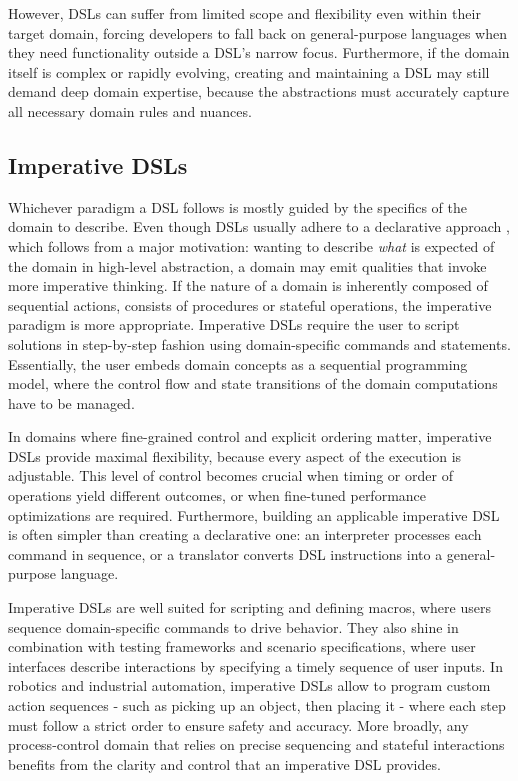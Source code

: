 However, DSLs can suffer from limited scope and flexibility even within their target domain, forcing developers to fall back on general-purpose languages when they need functionality outside a
DSL's narrow focus. Furthermore, if the domain itself is complex or rapidly evolving, creating and maintaining a DSL may still demand deep domain expertise, because the abstractions must
accurately capture all necessary domain rules and nuances.

\subsection{Imperative DSLs}

Whichever paradigm a DSL follows is mostly guided by the specifics of the domain to describe. Even though DSLs usually adhere to a declarative approach \cite{sigplanDSL}, which follows from a
major motivation: wanting to describe \textit{what} is expected of the domain in high-level abstraction, a domain may emit qualities that invoke more imperative thinking.
If the nature of a domain is inherently composed of sequential actions, consists of procedures or stateful operations, the imperative paradigm is more appropriate.
Imperative DSLs require the user to script solutions in step-by-step fashion using domain-specific commands and statements. Essentially, the user embeds domain concepts as a sequential programming model,
where the control flow and state transitions of the domain computations have to be managed.

In domains where fine-grained control and explicit ordering matter, imperative DSLs provide maximal flexibility, because every aspect of the execution is adjustable.
This level of control becomes crucial when timing or order of operations yield different outcomes, or when fine-tuned performance optimizations are required.
Furthermore, building an applicable imperative DSL is often simpler than creating a declarative one: an interpreter processes each command in sequence,
or a translator converts DSL instructions into a general-purpose language.

Imperative DSLs are well suited for scripting and defining macros, where users sequence domain-specific commands to drive behavior. They also shine in combination with testing
frameworks and scenario specifications, where user interfaces describe interactions by specifying a timely sequence of user inputs. In robotics and industrial automation,
imperative DSLs allow to program custom action sequences - such as picking up an object, then placing it - where each step must follow a
strict order to ensure safety and accuracy. More broadly, any process-control domain that relies on precise sequencing and stateful interactions benefits from the clarity
and control that an imperative DSL provides.

